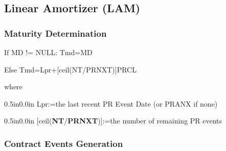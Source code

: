 \documentclass[9pt,oneside]{amsart}
\begin{document}



\iffalse






\vspace{\baselineskip}
\subsection{Linear Amortizer (LAM)}
\subsubsection{Maturity Determination}
If MD != NULL: Tmd=MD

Else Tmd=Lpr+[ceil(NT/PRNXT)]PRCL

where \par

\setlength{\parskip}{0.0pt}
\begin{adjustwidth}{0.5in}{0.0in}
Lpr:=the last recent PR Event Date (or PRANX if none)\par

\end{adjustwidth}

\begin{adjustwidth}{0.5in}{0.0in}
[ceil(\textbf{NT}/\textbf{PRNXT})]:=the number of remaining PR events

\end{adjustwidth}

\setlength{\parskip}{8.04pt}
\subsubsection{Contract Events Generation}


\end{document}
